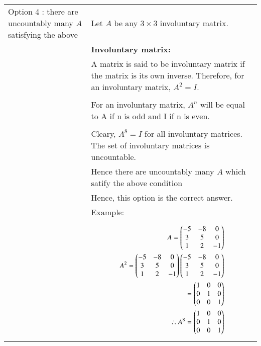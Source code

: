 \documentclass[journal,12pt,twocolumn]{IEEEtran}
\begin{document}
\begin{table}[h!]
\begin{center}
\begin{tabular}{ | m{3cm} | m{6cm}| } \hline 
Option 4 :  there are uncountably many  $A$ satisfying the above & Let $A$ be any $3 \times 3$  involuntary matrix. \\&
\textbf{Involuntary matrix: }\\&A matrix is said to be involuntary matrix if the matrix is its own inverse. Therefore, for an involuntary matrix,  $A^2 = I$. \\&\\&
For an involuntary matrix, $A^n$ will be equal to A if n is odd and I if n is even.\\&\\&
Cleary, $A^8 = I$ for all involuntary matrices. The set of involuntary matrices is uncountable.\\&  Hence there are uncountably many $A$ which satify the above condition\\&
Hence, this option is the correct answer.\\&
Example:\\&
{\begin{align*}
A = \begin{pmatrix}-5&-8&0\\3&5&0\\1&2&-1\end{pmatrix}\\
A^2= \begin{pmatrix}-5&-8&0\\3&5&0\\1&2&-1\end{pmatrix}\begin{pmatrix}-5&-8&0\\3&5&0\\1&2&-1\end{pmatrix}\\
= \begin{pmatrix}1&0&0\\0&1&0\\0&0&1\end{pmatrix}\\
\therefore A^8 = \begin{pmatrix}1&0&0\\0&1&0\\0&0&1\end{pmatrix}\\
\end{align*}}
\\  \hline

\end{tabular}
\end{center}
\end{table}
\end{document}
